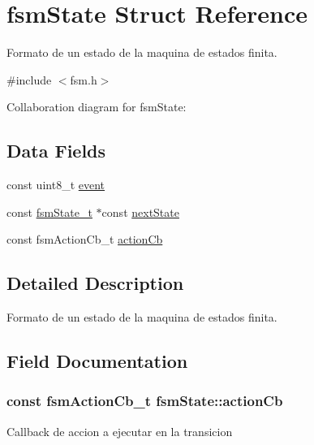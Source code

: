 \hypertarget{structfsmState}{}\section{fsm\+State Struct Reference}
\label{structfsmState}


Formato de un estado de la maquina de estados finita.  




{\ttfamily \#include $<$fsm.\+h$>$}



Collaboration diagram for fsm\+State\+:
\subsection*{Data Fields}
\begin{DoxyCompactItemize}
\item 
const uint8\+\_\+t \hyperlink{structfsmState_ae7a35fc5aec6884f24d5c8c293af155b}{event}
\item 
const \hyperlink{structfsmState}{fsm\+State\+\_\+t} $\ast$const \hyperlink{structfsmState_aec2706243c56627e33f8744dc38b964a}{next\+State}
\item 
const fsm\+Action\+Cb\+\_\+t \hyperlink{structfsmState_a496dddb5715b31b1efaf83758a34f6f2}{action\+Cb}
\end{DoxyCompactItemize}


\subsection{Detailed Description}
Formato de un estado de la maquina de estados finita. 

\subsection{Field Documentation}
\subsubsection[{\texorpdfstring{action\+Cb}{actionCb}}]{\setlength{\rightskip}{0pt plus 5cm}const fsm\+Action\+Cb\+\_\+t fsm\+State\+::action\+Cb}\hypertarget{structfsmState_a496dddb5715b31b1efaf83758a34f6f2}{}\label{structfsmState_a496dddb5715b31b1efaf83758a34f6f2}
Callback de accion a ejecutar en la transicion 
